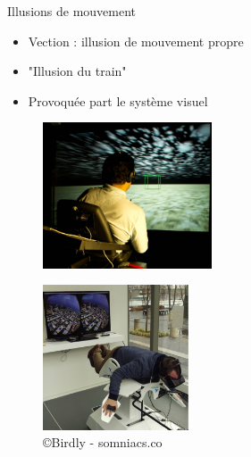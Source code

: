 \begin{frame}{Illusions de mouvement}

\begin{itemize}
\item Vection : illusion de mouvement propre
\item "Illusion du train"
\item Provoquée part le système visuel
\end{itemize}
\begin{multicols}{2}
\begin{figure}
\centering
\includegraphics[width=5cm]{images/opticflow}
\caption{\cite{Riecke2005}}
\end{figure}
\begin{figure}
\centering
\includegraphics[width=4.3cm]{images/birdly}
\caption{\copyright Birdly - somniacs.co}
\end{figure}
\end{multicols}
\end{frame}

